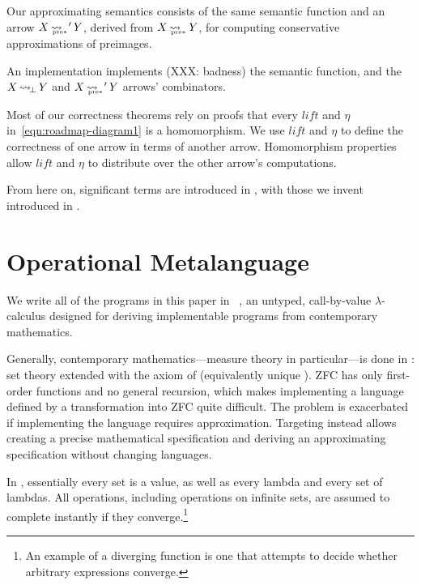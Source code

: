 \documentclass[preprint]{sigplanconf}
\newcommand{\arrow}{\rightsquigarrow}
\newcommand{\arrowlift}{\ensuremath{lift}}
\newcommand{\arrowtrans}{\ensuremath{\eta}}
\DeclareMathOperator{\botto}{\arrow_{\mspace{-3mu}\bot}}
\DeclareMathOperator{\ppreto}{\arrow_{\mspace{-19mu}_{\mathrm{pre*}}}}
\begin{document}
Our approximating semantics consists of the same semantic function and an arrow $X \ppreto' Y$, derived from $X \ppreto Y$, for computing conservative approximations of preimages.

An implementation implements (XXX: badness) the semantic function, and the $X \botto Y$ and $X \ppreto' Y$ arrows' combinators.

Most of our correctness theorems rely on proofs that every $\arrowlift$ and $\arrowtrans$ in~\eqref{eqn:roadmap-diagram1} is a homomorphism.
We use $\arrowlift$ and $\arrowtrans$ to define the correctness of one arrow in terms of another arrow.
Homomorphism properties allow $\arrowlift$ and $\arrowtrans$ to distribute over the other arrow's computations.

From here on, significant terms are introduced in , with those we invent introduced in .


\section{Operational Metalanguage}

We write all of the programs in this paper in \lzfclang~\cite{cit:toronto-2012flops-lzfc}, an untyped, call-by-value $\lambda$-calculus designed for deriving implementable programs from contemporary mathematics.

Generally, contemporary mathematics---measure theory in particular---is done in :  set theory extended with the axiom of  (equivalently unique ).
ZFC has only first-order functions and no general recursion, which makes implementing a language defined by a transformation into ZFC quite difficult.
The problem is exacerbated if implementing the language requires approximation.
Targeting \lzfclang instead allows creating a precise mathematical specification and deriving an approximating specification without changing languages.

In \lzfclang, essentially every set is a value, as well as every lambda and every set of lambdas.
All operations, including operations on infinite sets, are assumed to complete instantly if they converge.\footnote{An example of a diverging \lzfclang function is one that attempts to decide whether arbitrary \lzfclang expressions converge.}
\end{document}
